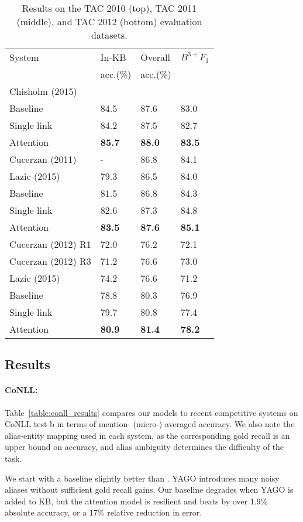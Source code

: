 \begin{table}[ht!]
\centering
\begin{tabular}{l|l|l|l}
 System & In-KB & Overall & {\small ${B^{3+}F_1}$} \\ 
 & acc.(\%) & acc.(\%) & \\
\hline
{Chisholm (2015)} & & & \\
  Baseline & 84.5 & 87.6 & 83.0 \\
 Single link & 84.2 & 87.5 & 82.7\\
 Attention & {\bf 85.7} & {\bf 88.0} & {\bf 83.5} \\
\hline \hline
Cucerzan (2011) & - & 86.8 &  {84.1} \\
Lazic (2015) & 79.3 & 86.5 & 84.0 \\
Baseline & 81.5 & 86.8 & 84.3 \\
Single link & 82.6 & 87.3 & 84.8 \\
 Attention & {\bf 83.5} & {\bf 87.6} & {\bf 85.1} \\
\hline
\hline
Cucerzan (2012) R1 & 72.0 & 76.2 & 72.1  \\
Cucerzan (2012) R3 & 71.2 & 76.6 & 73.0 \\
Lazic (2015) & {74.2} & {76.6} & 71.2 \\
Baseline &78.8 & 80.3 & 76.9\\
 Single link & 79.7 & 80.8 & 77.4  \\
 Attention &{\bf 80.9} & {\bf 81.4} & {\bf 78.2} \\
\end{tabular}
\caption{Results on the TAC 2010 (top), TAC 2011 (middle), and TAC 2012 (bottom) evaluation datasets. \label{table:tac_results} }
\end{table}


\subsection{Results}

\paragraph*{CoNLL:}
Table~\ref{table:conll_results} compares our models to recent
competitive systems on CoNLL test-b in terms of mention- (micro-)
averaged accuracy.  We also note the alias-entity mapping used in each
system, as the corresponding gold recall is an upper bound on
accuracy, and alias ambiguity determines the difficulty of the task.

We start with a baseline slightly better than .
YAGO introduces many noisy aliases without sufficient gold recall
gains.  Our baseline degrades when YAGO is added to KB, but the
attention model is resilient and beats  by over
1.9\% absolute accuracy, or a 17\% relative reduction in error.

